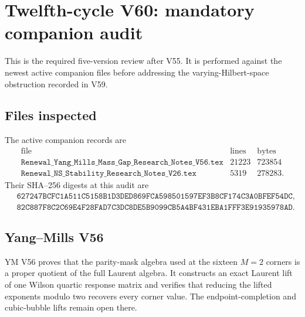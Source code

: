 \documentclass[11pt]{article}
\theoremstyle{remark}
\begin{document}

\section{Twelfth-cycle V60: mandatory companion audit}
\label{sec:v12v60}

This is the required five-version review after V55.  It is performed
against the newest active companion files before addressing the
varying-Hilbert-space obstruction recorded in V59.

\subsection{Files inspected}

The active companion records are
\[
\begin{array}{c|r|r}
\text{file}&\text{lines}&\text{bytes}\\ \hline
\texttt{Renewal\_Yang\_Mills\_Mass\_Gap\_Research\_Notes\_V56.tex}
 &21223&723854\\
\texttt{Renewal\_NS\_Stability\_Research\_Notes\_V26.tex}
 &5319&278283.
\end{array}                                      \tag{60.1}
\]
Their SHA--256 digests at this audit are
\[
\begin{split}
 &\texttt{627247BCFC1A511C5158B1D3DED869FCA598501597EF3B8CF174C3A0BFEF54DC},\\
 &\texttt{82C887F8C2C69E4F28FAD7C3DC8DE5B9099CB5A4BF431EBA1FFF3E91935978AD}.
\end{split}                                      \tag{60.2}
\]

\subsection{Yang--Mills V56}

YM V56 proves that the parity-mask algebra used at the sixteen
\(M=2\) corners is a proper quotient of the full Laurent algebra.
It constructs an exact Laurent lift of one Wilson quartic response
matrix and verifies that reducing the lifted exponents modulo two
recovers every corner value.  The endpoint-completion and
cubic-bubble lifts remain open there.
\end{document}
